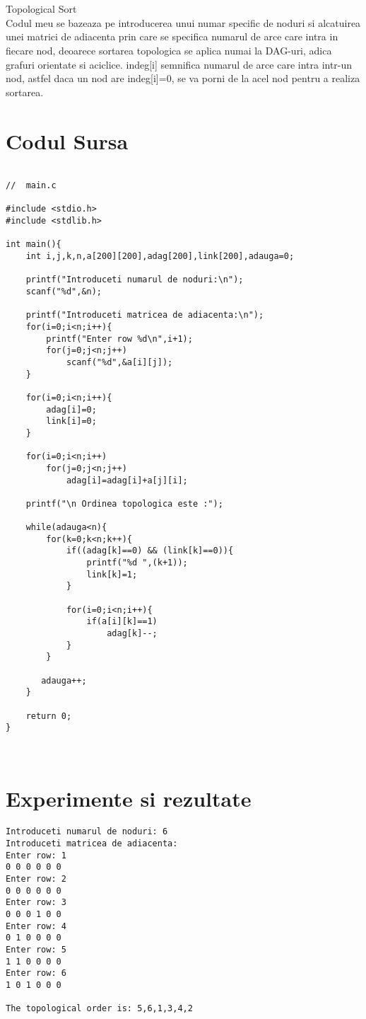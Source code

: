 ﻿\documentclass[14pt]{article}
\begin{document}
\\\vspace{3 mm}
\\Topological Sort
\\ Codul meu se bazeaza pe introducerea unui numar specific de noduri si alcatuirea unei matrici de adiacenta prin care se specifica numarul de arce care intra in fiecare nod, deoarece sortarea topologica se aplica numai la DAG-uri, adica grafuri orientate si aciclice. 
indeg[i] semnifica numarul de arce care intra intr-un nod, astfel daca un nod are indeg[i]=0, se va porni de la acel nod pentru a realiza sortarea.
\newpage
\section*{Codul Sursa}
\begin{lstlisting}

//  main.c

#include <stdio.h>
#include <stdlib.h>

int main(){
    int i,j,k,n,a[200][200],adag[200],link[200],adauga=0;

    printf("Introduceti numarul de noduri:\n");
    scanf("%d",&n);

    printf("Introduceti matricea de adiacenta:\n");
    for(i=0;i<n;i++){
        printf("Enter row %d\n",i+1);
        for(j=0;j<n;j++)
            scanf("%d",&a[i][j]);
    }

    for(i=0;i<n;i++){
        adag[i]=0;
        link[i]=0;
    }

    for(i=0;i<n;i++)
        for(j=0;j<n;j++)
            adag[i]=adag[i]+a[j][i];

    printf("\n Ordinea topologica este :");

    while(adauga<n){
        for(k=0;k<n;k++){
            if((adag[k]==0) && (link[k]==0)){
                printf("%d ",(k+1));
                link[k]=1;
            }

            for(i=0;i<n;i++){
                if(a[i][k]==1)
                    adag[k]--;
            }
        }

       adauga++;
    }

    return 0;
}



\end{lstlisting}

\newpage
\section*{Experimente si rezultate}
\begin{lstlisting}
Introduceti numarul de noduri: 6
Introduceti matricea de adiacenta:
Enter row: 1
0 0 0 0 0 0
Enter row: 2
0 0 0 0 0 0
Enter row: 3
0 0 0 1 0 0
Enter row: 4
0 1 0 0 0 0
Enter row: 5
1 1 0 0 0 0
Enter row: 6
1 0 1 0 0 0

The topological order is: 5,6,1,3,4,2


\end{lstlisting}
\end{document}
